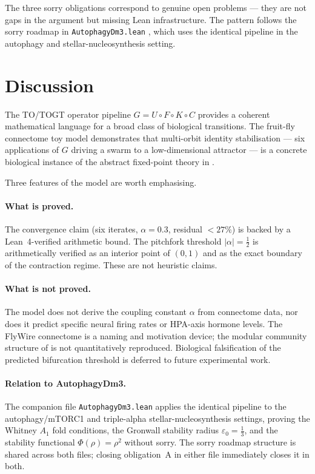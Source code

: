 \documentclass[12pt,a4paper]{article}
\begin{document}
The three sorry obligations correspond to genuine open problems ---
they are not gaps in the argument but missing Lean infrastructure.
The pattern follows the sorry roadmap in \texttt{AutophagyDm3.lean}
\cite{AXLE2026}, which uses the identical pipeline in the autophagy
and stellar-nucleosynthesis setting.

\section{Discussion}
\label{sec:discussion}

The TO/TOGT operator pipeline $G = U \circ F \circ K \circ C$
provides a coherent mathematical language for a broad class of
biological transitions. The fruit-fly connectome toy model
demonstrates that multi-orbit identity stabilisation --- six
applications of $G$ driving a swarm to a low-dimensional attractor
--- is a concrete biological instance of the abstract fixed-point
theory in \cite{Grossi2026_MultiAgent}.

Three features of the model are worth emphasising.

\paragraph{What is proved.}
The convergence claim (six iterates, $\alpha=0.3$, residual
$<27\%$) is backed by a Lean~4-verified arithmetic bound. The
pitchfork threshold $|\alpha|=\tfrac{1}{2}$ is arithmetically verified
as an interior point of $(0,1)$ and as the exact boundary of the
contraction regime. These are not heuristic claims.

\paragraph{What is not proved.}
The model does not derive the coupling constant $\alpha$ from
connectome data, nor does it predict specific neural firing rates or
HPA-axis hormone levels. The FlyWire connectome is a naming and
motivation device; the modular community structure of
\cite{Schlegel2024} is not quantitatively reproduced. Biological
falsification of the predicted bifurcation threshold is deferred to
future experimental work.

\paragraph{Relation to AutophagyDm3.}
The companion file \texttt{AutophagyDm3.lean} \cite{AXLE2026} applies
the identical pipeline to the autophagy/mTORC1 and triple-alpha
stellar-nucleosynthesis settings, proving the Whitney $A_{1}$ fold
conditions, the Gronwall stability radius $\varepsilon_{0}=\tfrac{1}{3}$,
and the stability functional $\Phi(\rho)=\rho^{2}$ without sorry.
The sorry roadmap structure is shared across both files; closing
obligation~A in either file immediately closes it in both.
\end{document}
